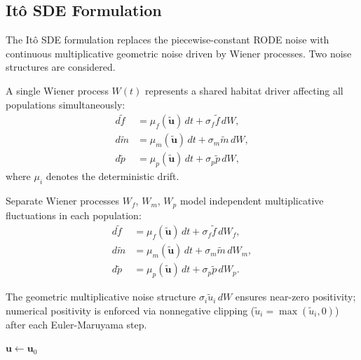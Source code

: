 \documentclass[12pt]{article}
\begin{document}
\subsection{It\^{o} SDE Formulation}

The It\^{o} SDE formulation replaces the piecewise-constant RODE noise with continuous multiplicative geometric noise driven by Wiener processes.  Two noise structures are considered.

A single Wiener process $W(t)$ represents a shared habitat driver affecting all populations simultaneously:
\begin{align}
  d\tilde{f} &= \mu_f(\tilde{\mathbf{u}})\,dt + \sigma_f \tilde{f}\,dW, \label{eq:ItoCommonF} \\
  d\tilde{m} &= \mu_m(\tilde{\mathbf{u}})\,dt + \sigma_m \tilde{m}\,dW, \\
  d\tilde{p} &= \mu_p(\tilde{\mathbf{u}})\,dt + \sigma_p \tilde{p}\,dW,
\end{align}
where $\mu_i$ denotes the deterministic drift.

Separate Wiener processes $W_f$, $W_m$, $W_p$ model independent multiplicative fluctuations in each population:
\begin{align}
  d\tilde{f} &= \mu_f(\tilde{\mathbf{u}})\,dt + \sigma_f \tilde{f}\,dW_f, \\
  d\tilde{m} &= \mu_m(\tilde{\mathbf{u}})\,dt + \sigma_m \tilde{m}\,dW_m, \\
  d\tilde{p} &= \mu_p(\tilde{\mathbf{u}})\,dt + \sigma_p \tilde{p}\,dW_p.
\end{align}

The geometric multiplicative noise structure $\sigma_i \tilde{u}_i\,dW$ ensures near-zero positivity; numerical positivity is enforced via nonnegative clipping ($\tilde{u}_i = \max(\tilde{u}_i, 0)$) after each Euler-Maruyama step.

\begin{algorithm}[H]
\DontPrintSemicolon
\SetAlgoLined
{}
$\mathbf{u} \leftarrow \mathbf{u}_0$\;
\caption{Euler-Maruyama method (It\^{o} SDE)}
\label{alg:EM}
\end{algorithm}
\end{document}
